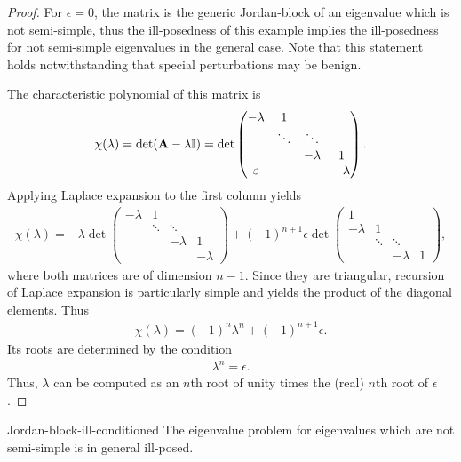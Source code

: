 \begin{proof}
  For $\epsilon=0$, the matrix is the generic Jordan-block of an eigenvalue which is not semi-simple, thus the ill-posedness of this example implies the ill-posedness for not semi-simple eigenvalues in the general case. Note that this statement holds notwithstanding that special perturbations may be benign.

  The characteristic polynomial of this matrix is
  \begin{gather}
      \chi(\lambda) = \det(\mathbf A-\lambda\mathbb I)
      = \det\begin{pmatrix}
      -\lambda&1\\
        &\ddots&\ddots\\
        &&-\lambda&1\\
        \varepsilon &&&-\lambda
      \end{pmatrix}.
  \end{gather}
  Applying Laplace expansion to the first column yields
  \begin{gather}
      \chi(\lambda)
      = -\lambda \det\begin{pmatrix}
        -\lambda&1\\
        &\ddots&\ddots\\
        &&-\lambda&1\\
        &&&-\lambda
      \end{pmatrix}
      + (-1)^{n+1} \epsilon\det\begin{pmatrix}
        1 \\
        -\lambda &1\\
        &\ddots&\ddots\\
        &&-\lambda&1
      \end{pmatrix},
  \end{gather}
  where both matrices are of dimension $n-1$. Since they are triangular, recursion of Laplace expansion is particularly simple and yields the product of the diagonal elements. Thus
  \begin{gather}
      \chi(\lambda) = (-1)^n \lambda^n
      + (-1)^{n+1} \epsilon.
  \end{gather}
  Its roots are determined by the condition
  \begin{gather}
      \lambda^n = \epsilon.
  \end{gather}
  Thus, $\lambda$ can be computed as an $n$th root of unity times the (real) $n$th root of $\epsilon$.
\end{proof}

\begin{Theorem}{Jordan-block-ill-conditioned}
  The eigenvalue problem for eigenvalues which are not semi-simple is
  in general ill-posed.
\end{Theorem}

